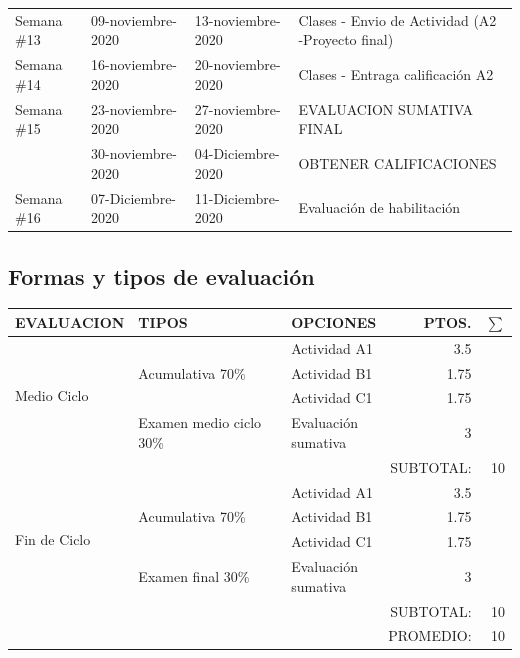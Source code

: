 \documentclass[a4paper,12pt,spanish]{article}
\begin{document}
\begin{center}
\begin{tabular}{|l|l|l|p{10cm}|}
Semana \#13 &  09-noviembre-2020 & 13-noviembre-2020 & Clases - Envio de Actividad (A2 -Proyecto final)\\ \rowcolor{green!20}
Semana \#14 &  16-noviembre-2020 & 20-noviembre-2020 & Clases - Entraga calificación A2\\ \rowcolor{red!20}
Semana \#15 &  23-noviembre-2020 & 27-noviembre-2020 & EVALUACION SUMATIVA FINAL\\
      &  30-noviembre-2020 & 04-Diciembre-2020 & OBTENER CALIFICACIONES\\ \hline \rowcolor{red!20}
Semana \#16 &  07-Diciembre-2020 & 11-Diciembre-2020 & Evaluación de habilitación\\ \hline
\end{tabular}
\end{center}





\restoregeometry

\subsection{Formas y tipos de evaluación}
\label{sec:formas-y-tipos}

\begin{tabular}[H]{|m{4cm}|m{5cm}|m{4cm}|r|r|}
  \hline \hline
  EVALUACION & TIPOS & OPCIONES & PTOS. & $\sum$ \\ \hline \hline
   \multirow{4}{*}{Medio Ciclo} & \multirow{3}{*}{Acumulativa 70\%} & Actividad A1 & 3.5 \\ \cline{3-3}
             &                                    & Actividad B1 & 1.75 \\ \cline{3-3}
             &                                    & Actividad C1 & 1.75\\ \cline{2-3}
             &Examen medio ciclo 30\% & Evaluación sumativa &3 \\ \hline \hline
  \multicolumn{4}{r}{SUBTOTAL:} & 10 \\ \hline
   \multirow{4}{*}{Fin de Ciclo} & \multirow{3}{*}{Acumulativa 70\%} & Actividad A1 & 3.5 \\ \cline{3-3}
             &                                    & Actividad B1 & 1.75 \\ \cline{3-3}
             &                                    & Actividad C1 & 1.75\\ \cline{2-3}
             &Examen final 30\% & Evaluación sumativa &3 \\ \hline \hline
  \multicolumn{4}{r}{SUBTOTAL:} & 10 \\ \hline
  \multicolumn{4}{r}{PROMEDIO:} & 10 \\ \hline

  
\end{tabular}
\end{document}
